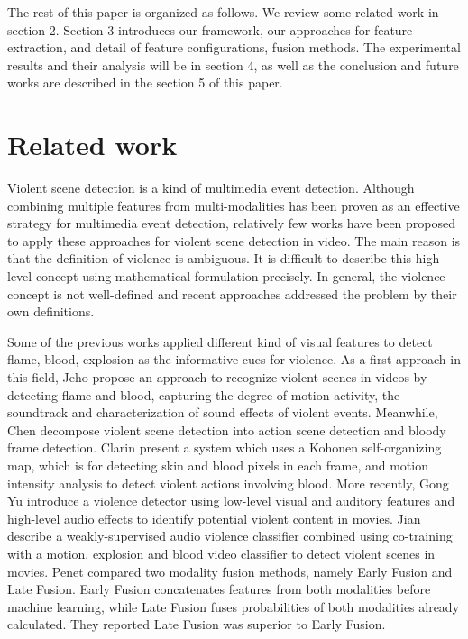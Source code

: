 \documentclass[review]{elsarticle}
\begin{document}
The rest of this paper is organized as follows. We review some related work in section 2. Section 3 introduces our framework, our approaches for feature extraction, and detail of feature configurations, fusion methods. The experimental results and their analysis will be in section 4, as well as the conclusion and future works are described in the section 5 of this paper.
\section{Related work}
Violent scene detection is a kind of multimedia event detection. Although combining multiple features from multi-modalities has been proven as an effective strategy for multimedia event detection, relatively few works have been proposed to apply these approaches for violent scene detection in video. The main reason is that the definition of violence is ambiguous. It is difficult to describe this high-level concept using mathematical formulation precisely. In general, the violence concept is not well-defined and recent approaches addressed the problem by their own definitions.

Some of the previous works applied different kind of visual features to detect flame, blood, explosion as the informative cues for violence. As a first approach in this field, Jeho \cite{nam1998audio} propose an approach to recognize violent scenes in videos by detecting flame and blood, capturing the degree of motion activity, the soundtrack and characterization of sound effects of violent events. Meanwhile, Chen \cite{2} decompose violent scene detection into action scene detection and bloody frame detection. Clarin \cite{3} present a system which uses a Kohonen self-organizing map, which is for detecting skin and blood pixels in each frame, and motion intensity analysis to detect violent actions involving blood. More recently, Gong Yu \cite{11} introduce a violence detector using low-level visual and auditory features and high-level audio effects to identify potential violent content in movies. Jian \cite{17} describe a weakly-supervised audio violence classifier combined using co-training with a motion, explosion and blood video classifier to detect violent scenes in movies. Penet \cite{21} compared two modality fusion methods, namely Early Fusion and Late Fusion. Early Fusion concatenates features from both modalities before machine learning, while Late Fusion fuses probabilities of both modalities already calculated. They reported Late Fusion was superior to Early Fusion.
\end{document}
